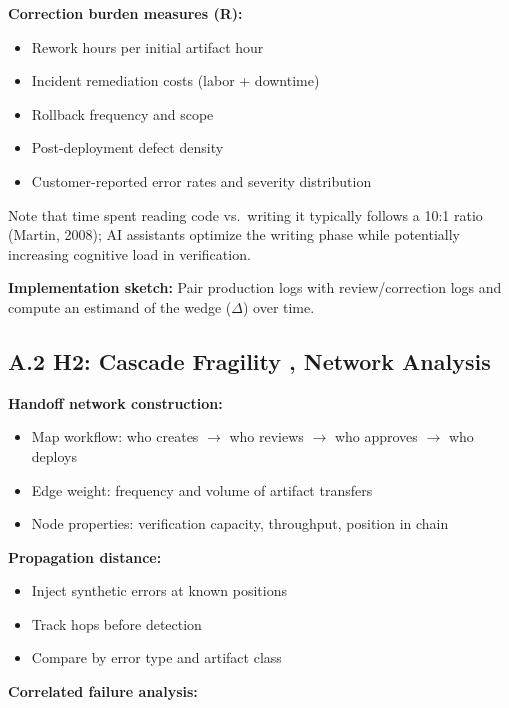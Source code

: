 \documentclass[11pt,a4paper]{article}
\providecommand{\tightlist}{\setlength{\itemsep}{0pt}\setlength{\parskip}{0pt}}
\begin{document}
\textbf{Correction burden measures (R):}

\begin{itemize}
\tightlist
\item
  Rework hours per initial artifact hour
\item
  Incident remediation costs (labor + downtime)
\item
  Rollback frequency and scope
\item
  Post-deployment defect density
\item
  Customer-reported error rates and severity distribution
\end{itemize}

Note that time spent reading code vs.~writing it typically follows a 10:1 ratio (Martin, 2008); AI assistants optimize the writing phase while potentially increasing cognitive load in verification.

\textbf{Implementation sketch:} Pair production logs with review/correction logs and compute an estimand of the wedge ($\Delta$) over time.

\hypertarget{a.2-h2-cascade-fragility-network-analysis}{%
\subsection{A.2 H2: Cascade Fragility ,  Network Analysis}\label{a.2-h2-cascade-fragility-network-analysis}}

\textbf{Handoff network construction:}

\begin{itemize}
\tightlist
\item
  Map workflow: who creates $\to$ who reviews $\to$ who approves $\to$ who deploys
\item
  Edge weight: frequency and volume of artifact transfers
\item
  Node properties: verification capacity, throughput, position in chain
\end{itemize}

\textbf{Propagation distance:}

\begin{itemize}
\tightlist
\item
  Inject synthetic errors at known positions
\item
  Track hops before detection
\item
  Compare by error type and artifact class
\end{itemize}

\textbf{Correlated failure analysis:}
\end{document}
